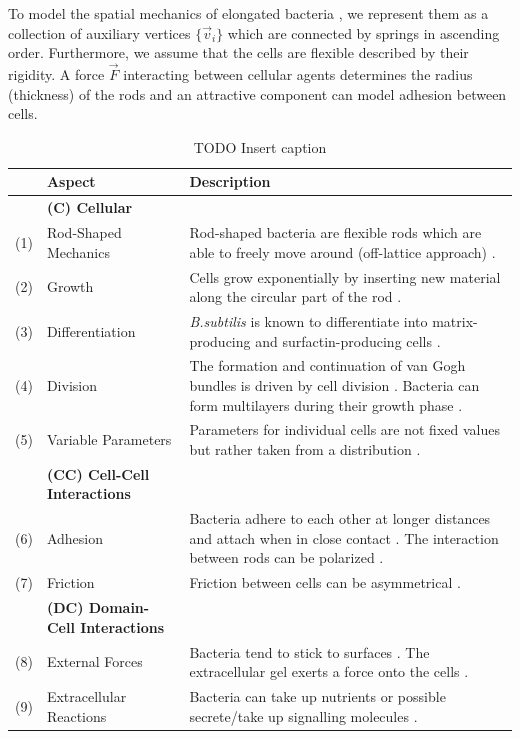 \documentclass{article}
\begin{document}
To model the spatial mechanics of elongated bacteria \cite{Billaudeau2017}, we represent them as a
collection of auxiliary vertices $\{\vec{v}_i\}$ which are connected by springs in
ascending order.
Furthermore, we assume that the cells are flexible described by their rigidity.
A force $\vec{F}$ interacting between cellular agents determines the radius (thickness) of the
rods and an attractive component can model adhesion between cells.
\begin{table}
    \centering
    \def\arraystretch{1.3}
    \begin{tabularx}{\textwidth}{c l X}
        &\textbf{Aspect} & \textbf{Description}\\
        \toprule
        &\textbf{(C) Cellular}\\
        \midrule
        (1) & Rod-Shaped Mechanics &
            Rod-shaped bacteria are flexible rods which are able to freely move around (off-lattice
            approach) \cite{Takeuchi2005,Ursell2014,Amir2014_2}.\\
        (2) & Growth &
            Cells grow exponentially by inserting new material along the circular part of the rod
            \cite{Robert2014,Takeuchi2005}.\\
        (3) & Differentiation &
            \textit{B.subtilis} is known to differentiate into matrix-producing and
            surfactin-producing cells \cite{vanGestel2015,Lpez2010}.\\
        (4) & Division &
            The formation and continuation of van Gogh bundles is driven by cell division
            \cite{vanGestel2015}.
            Bacteria can form multilayers during their growth phase \cite{Duvernoy2018}.\\
        (5) & Variable Parameters &
            Parameters for individual cells are not fixed values but rather taken from a
            distribution \cite{Koutsoumanis2013}.\\
        &\textbf{(CC) Cell-Cell Interactions}\\
        \midrule
        (6) & Adhesion &
            Bacteria adhere to each other at longer distances and attach when in close contact
            \cite{Verwey1947,Trejo2013}.
            The interaction between rods can be polarized \cite{Duvernoy2018}.\\
        (7) & Friction &
            Friction between cells \cite{Grant2014} can be asymmetrical \cite{Doumic2020}.\\
        &\textbf{(DC) Domain-Cell Interactions}\\
        \midrule
        (8) & External Forces &
            Bacteria tend to stick to surfaces \cite{vanLoosdrecht1989}.
            The extracellular gel exerts a force onto the cells \cite{Grant2014}.\\
        (9) & Extracellular Reactions &
            Bacteria can take up nutrients or possible secrete/take up signalling molecules
            \cite{Li2025}.\\
        \bottomrule
    \end{tabularx}
    \label{table:simulation-aspects}
    \caption{TODO Insert caption}
\end{table}
\end{document}
